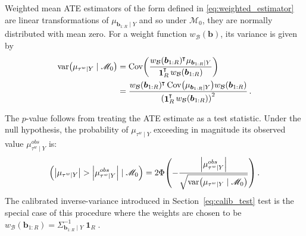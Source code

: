 \documentclass[letter]{article}
\DeclarePairedDelimiter{\parenthesis}{\lparen}{\rparen}
\DeclarePairedDelimiter{\absolutevalue}{\lvert}{\rvert}
\newcommand{\del}[1]{\parenthesis*{#1}}
\newcommand{\abs}[1]{\absolutevalue*{#1}}
\let\Pr\relax
\DeclareMathOperator{\Pr}{\mathbb{P}}
\DeclareMathOperator{\cov}{{Cov}}
\DeclareMathOperator{\var}{{var}}
\DeclareMathOperator{\ones}{\mathbf{1}}
\newcommand*{\trans}{^{\mkern-1.5mu\intercal}}
\newcommand{\border}{\mathcal{B}}
\newcommand{\sentinel}{\bm{b}}
\newcommand{\numsent}{R}
\newcommand{\sentinels}{\sentinel_{1:\numsent}}
\newcommand{\tauw}{\tau^{w}}
\newcommand{\modnull}{\mathscr{M}_0}
\newcommand{\weightb}{w_{\border}}
\begin{document}
    	Weighted mean ATE estimators of the form defined in \eqref{eq:weighted_estimator} are linear transformations of \(\mu_{\sentinels \mid Y}\) and so under \(\modnull\), they are normally distributed with mean zero.
For a weight function \(\weightb(\sentinel)\), its variance is given by
\begin{equation}
\begin{aligned}
    \var\del{\mu_{\tauw \mid Y} \mid \modnull} &= \cov\del{ \frac{\weightb(\sentinels)\trans \mu_{\sentinels \mid Y}}{\ones_{\numsent}\trans \weightb(\sentinels)}} \\
    &= \frac{\weightb(\sentinels) \trans \cov \del{\mu_{\sentinels \mid Y}} \weightb(\sentinels)}{\del{\ones_{\numsent}\trans \weightb(\sentinels)}^2}
    \,.
\end{aligned}
\end{equation}
    

    	The \(p\)-value follows from treating the ATE estimate as a test statistic.
Under the null hypothesis, the probability of \(\mu_{\tauw \mid Y}\) exceeding in magnitude its observed value \(\mu_{\tauw \mid Y}^{obs}\) is:
\begin{equation}
    \Pr\del{ \abs{\mu_{\tauw \mid Y}} > \abs{\mu_{\tauw \mid Y}^{obs}} \mid \modnull} = 2 \Phi\del{ -\frac{\abs{\mu_{\tauw \mid Y}^{obs}}}{\sqrt{\var\del{\mu_{\tauw \mid Y} \mid \modnull}}} }\,.
\end{equation}
The calibrated inverse-variance introduced in Section~\ref{eq:calib_test} test is the special case of this procedure where the weights are chosen to be \(\weightb(\sentinels) = \Sigma^{-1}_{\sentinels \mid Y} \ones_{\numsent}\).
    
\end{document}
